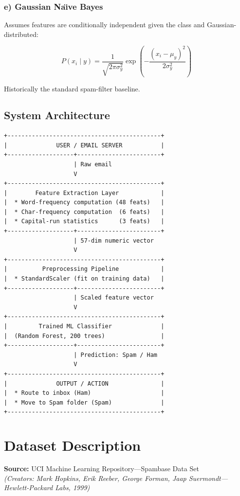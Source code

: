 \documentclass[12pt, a4paper]{article}
\begin{document}
\subsubsection*{e) Gaussian Na\"{\i}ve Bayes}
Assumes features are conditionally independent given the class and Gaussian-distributed:

\begin{equation}
P(x_i \mid y) = \frac{1}{\sqrt{2\pi\sigma_y^2}}\exp\!\left(-\frac{(x_i - \mu_y)^2}{2\sigma_y^2}\right)
\end{equation}

Historically the standard spam-filter baseline.

\subsection{System Architecture}

\begin{verbatim}
+--------------------------------------------+
|              USER / EMAIL SERVER           |
+-------------------+------------------------+
                    | Raw email
                    V
+--------------------------------------------+
|        Feature Extraction Layer            |
|  * Word-frequency computation (48 feats)   |
|  * Char-frequency computation  (6 feats)   |
|  * Capital-run statistics      (3 feats)   |
+-------------------+------------------------+
                    | 57-dim numeric vector
                    V
+--------------------------------------------+
|          Preprocessing Pipeline            |
|  * StandardScaler (fit on training data)   |
+-------------------+------------------------+
                    | Scaled feature vector
                    V
+--------------------------------------------+
|         Trained ML Classifier              |
|  (Random Forest, 200 trees)                |
+-------------------+------------------------+
                    | Prediction: Spam / Ham
                    V
+--------------------------------------------+
|              OUTPUT / ACTION               |
|  * Route to inbox (Ham)                    |
|  * Move to Spam folder (Spam)              |
+--------------------------------------------+
\end{verbatim}


\section{Dataset Description}

\textbf{Source:} UCI Machine Learning Repository---Spambase Data Set\\
\textit{(Creators: Mark Hopkins, Erik Reeber, George Forman, Jaap Suermondt---Hewlett-Packard Labs, 1999)}
\end{document}
